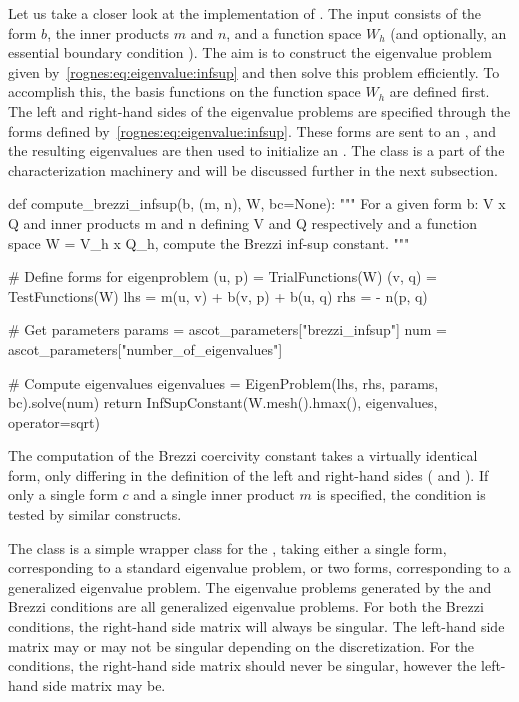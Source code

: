 Let us take a closer look at the implementation
of . The input consists of the form $b$,
the inner products $m$ and $n$, and a function space $W_h$ (and
optionally, an essential boundary condition ). The aim is to
construct the eigenvalue problem given
by~\eqref{rognes:eq:eigenvalue:infsup} and then solve this problem
efficiently. To accomplish this, the basis functions on the function
space $W_h$ are defined first. The left and right-hand sides of the
eigenvalue problems are specified through the forms defined
by~\eqref{rognes:eq:eigenvalue:infsup}. These forms are sent to an
, and the resulting eigenvalues are then
used to initialize an . The
 class is a part of the
characterization machinery and will be discussed further in the next
subsection.
\begin{python}
def compute_brezzi_infsup(b, (m, n), W, bc=None):
    """
    For a given form b: V x Q \rightarrow \R and inner products m and
    n defining V and Q respectively and a function space W = V_h x
    Q_h, compute the Brezzi inf-sup constant.
    """

    # Define forms for eigenproblem
    (u, p) = TrialFunctions(W)
    (v, q) = TestFunctions(W)
    lhs = m(u, v) + b(v, p) + b(u, q)
    rhs = - n(p, q)

    # Get parameters
    params = ascot_parameters["brezzi_infsup"]
    num = ascot_parameters["number_of_eigenvalues"]

    # Compute eigenvalues
    eigenvalues = EigenProblem(lhs, rhs, params, bc).solve(num)
    return InfSupConstant(W.mesh().hmax(), eigenvalues, operator=sqrt)
\end{python}
The computation of the Brezzi coercivity constant takes a virtually
identical form, only differing in the definition of the left and
right-hand sides ( and ). If only a single form $c$
and a single inner product $m$ is specified, the \babuska{} condition
is tested by similar constructs.

The  class is a simple wrapper class for the
\dolfin{} , taking either a single form,
corresponding to a standard eigenvalue problem, or two forms,
corresponding to a generalized eigenvalue problem. The eigenvalue
problems generated by the \babuska{} and Brezzi conditions are all
generalized eigenvalue problems. For both the Brezzi conditions, the
right-hand side matrix will always be singular. The left-hand side
matrix may or may not be singular depending on the discretization. For
the \babuska{} conditions, the right-hand side matrix should never be
singular, however the left-hand side matrix may be.

